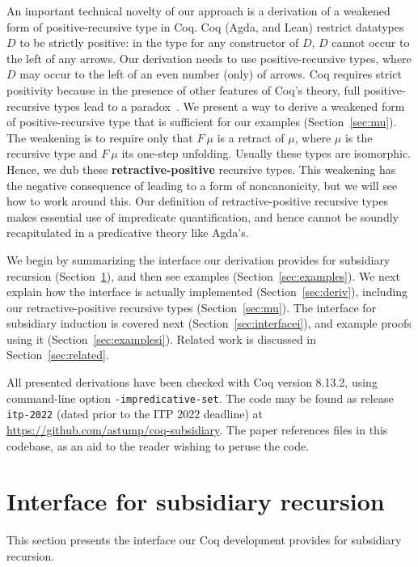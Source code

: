 \documentclass[a4paper,USenglish]{lipics-v2021}
\begin{document}
An important technical novelty of our approach is a derivation of a
weakened form of positive-recursive type in Coq.  Coq (Agda, and Lean)
restrict datatypes $D$ to be strictly positive: in the type for any
constructor of $D$, $D$ cannot occur to the left of any arrows.  Our
derivation needs to use positive-recursive types, where $D$ may occur
to the left of an even number (only) of arrows.  Coq requires strict
positivity because in the presence of other features of Coq's theory,
full positive-recursive types lead to a paradox~\cite{coquand88}.  We
present a way to derive a weakened form of positive-recursive type
that is sufficient for our examples (Section~\ref{sec:mu}).  The
weakening is to require only that $F\ \mu$ is a retract of $\mu$,
where $\mu$ is the recursive type and $F\ \mu$ its one-step unfolding.
Usually these types are isomorphic.  Hence, we dub these
\textbf{retractive-positive} recursive types.  This weakening has the
negative consequence of leading to a form of noncanonicity, but we
will see how to work around this.  Our definition of
retractive-positive recursive types makes essential use of impredicate
quantification, and hence cannot be soundly recapitulated in a
predicative theory like Agda's.

We begin by summarizing the interface our derivation provides for
subsidiary recursion (Section~\ref{sec:interface}), and then see
examples (Section~\ref{sec:examples}).  We next explain how the
interface is actually implemented (Section~\ref{sec:deriv}), including
our retractive-positive recursive types (Section~\ref{sec:mu}).  The
interface for subsidiary induction is covered next
(Section~\ref{sec:interfacei}), and example proofs using it
(Section~\ref{sec:examplesi}).  Related work is discussed in
Section~\ref{sec:related}.

All presented derivations have been checked with Coq version 8.13.2,
using command-line option \verb|-impredicative-set|.  The code may be
found as release \verb|itp-2022| (dated prior to the ITP 2022
deadline) at \url{https://github.com/astump/coq-subsidiary}.  The
paper references files in this codebase, as an aid to the reader
wishing to peruse the code.

\section{Interface for subsidiary recursion}
\label{sec:interface}

This section presents the interface our Coq development provides
for subsidiary recursion.
\end{document}
